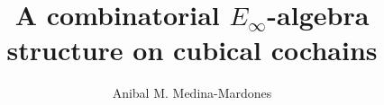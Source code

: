 \documentclass{amsart}
\theoremstyle{definition}
\begin{document}
\title{A combinatorial $E_\infty$-algebra structure on cubical cochains}
\author{Anibal M. Medina-Mardones}
\address{Max Plank Institute for Mathematics, Bonn, Germany}
\address{Department of Mathematics, University of Notre Dame, Notre Dame, IN, USA}


\begin{abstract}
	
\end{abstract} 

\maketitle
\tableofcontents


%


%



\end{document}
